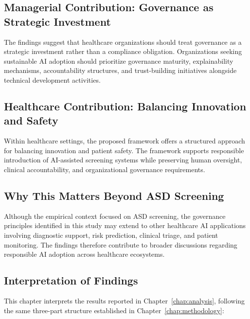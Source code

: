 \subsection{Managerial Contribution: Governance as Strategic Investment}
\label{sec:managerial_contribution}

\noindent The findings suggest that healthcare organizations should treat governance as a strategic investment rather than a compliance obligation. Organizations seeking sustainable AI adoption should prioritize governance maturity, explainability mechanisms, accountability structures, and trust-building initiatives alongside technical development activities.


\subsection{Healthcare Contribution: Balancing Innovation and Safety}
\label{sec:healthcare_contribution}

\noindent Within healthcare settings, the proposed framework offers a structured approach for balancing innovation and patient safety. The framework supports responsible introduction of AI-assisted screening systems while preserving human oversight, clinical accountability, and organizational governance requirements.


\subsection{Why This Matters Beyond ASD Screening}
\label{sec:why_matters_beyond_asd}

\noindent Although the empirical context focused on ASD screening, the governance principles identified in this study may extend to other healthcare AI applications involving diagnostic support, risk prediction, clinical triage, and patient monitoring. The findings therefore contribute to broader discussions regarding responsible AI adoption across healthcare ecosystems.

\subsection{Interpretation of Findings}

This chapter interprets the results reported in Chapter~\ref{chap:analysis}, following the same three-part structure established in Chapter~\ref{chap:methodology}:

